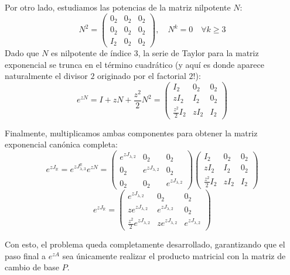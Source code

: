 {    Por otro lado, estudiamos las potencias de la matriz nilpotente $N$:
    \[
        N^2 = \begin{pmatrix} 0_2 & 0_2 & 0_2 \\ 0_2 & 0_2 & 0_2 \\ I_2 & 0_2 & 0_2 \end{pmatrix}, \quad N^k = 0 \quad \forall k \ge 3
    \]
    Dado que $N$ es nilpotente de índice 3, la serie de Taylor para la matriz exponencial se trunca en el término cuadrático (y aquí es donde aparece naturalmente el divisor $2$ originado por el factorial $2!$):
    \[
        e^{zN} = I + zN + \frac{z^2}{2}N^2 = 
        \begin{pmatrix}
            I_2 & 0_2 & 0_2 \\
            z I_2 & I_2 & 0_2 \\
            \frac{z^2}{2} I_2 & z I_2 & I_2
        \end{pmatrix}
    \]

    Finalmente, multiplicamos ambas componentes para obtener la matriz exponencial canónica completa:
    \[
        e^{z J_\mathbb{R}} = e^{z J^{\mathbb{R}}_{\lambda,3}} e^{zN} = 
        \begin{pmatrix}
            e^{z J_{\lambda,2}} & 0_2 & 0_2 \\
            0_2 & e^{z J_{\lambda,2}} & 0_2 \\
            0_2 & 0_2 & e^{z J_{\lambda,2}}
        \end{pmatrix}
        \begin{pmatrix}
            I_2 & 0_2 & 0_2 \\
            z I_2 & I_2 & 0_2 \\
            \frac{z^2}{2} I_2 & z I_2 & I_2
        \end{pmatrix}
    \]
    \[
        e^{z J_\mathbb{R}} = 
        \begin{pmatrix}
            e^{z J_{\lambda,2}} & 0_2 & 0_2 \\
            z e^{z J_{\lambda,2}} & e^{z J_{\lambda,2}} & 0_2 \\
            \frac{z^2}{2} e^{z J_{\lambda,2}} & z e^{z J_{\lambda,2}} & e^{z J_{\lambda,2}}
        \end{pmatrix}
    \]

    Con esto, el problema queda completamente desarrollado, garantizando que el paso final a $e^{zA}$ sea únicamente realizar el producto matricial con la matriz de cambio de base $P$.

}

